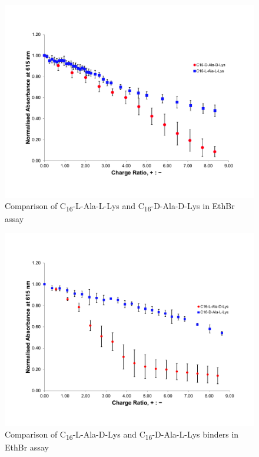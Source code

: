 \begin{figure} [ht!]
\centering
\includegraphics[scale=0.47]{Ethidium_Bromide/homochiral_pair_EthBr.pdf}
\caption{Comparison of C\textsubscript{16}-L-Ala-L-Lys and C\textsubscript{16}-D-Ala-D-Lys in EthBr assay}
\label{Etbr_homochiral}
\end{figure}
\begin{figure} [ht!]
\centering
\includegraphics[scale=0.47]{Ethidium_Bromide/heterochiral_pair_EthBr.pdf}
\caption{Comparison of C\textsubscript{16}-L-Ala-D-Lys and C\textsubscript{16}-D-Ala-L-Lys binders in EthBr assay}
\label{Etbr_heterochiral}
\end{figure}
\newpage

